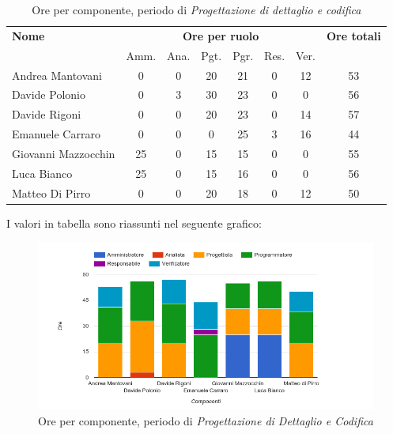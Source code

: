\begin{table}[H]
\begin{tabular}{lccccccc}
\toprule
    \textbf{Nome}  & \multicolumn{6}{c}{\textbf{Ore per ruolo}} & \textbf{Ore totali} \\
     & Amm. & Ana. & Pgt. & Pgr. & Res. & Ver. & \\
    \midrule
    
	   Andrea Mantovani & 0 & 0 & 20 & 21 & 0 & 12 & 53 \\
	     Davide Polonio & 0 & 3 & 30 & 23 & 0 & 0 & 56 \\
	      Davide Rigoni & 0 & 0 & 20 & 23 & 0 & 14 & 57 \\
	   Emanuele Carraro & 0 & 0 & 0 & 25 & 3 & 16 & 44 \\
	Giovanni Mazzocchin & 25 & 0 & 15 & 15 & 0 & 0 & 55 \\
	        Luca Bianco & 25 & 0 & 15 & 16 & 0 & 0 & 56 \\
	    Matteo Di Pirro & 0 & 0 & 20 & 18 & 0 & 12 & 50 \\
    
    
    \bottomrule
\end{tabular}
\caption{Ore per componente, periodo di \textit{Progettazione di dettaglio e codifica}}
\end{table}

I valori in tabella sono riassunti nel seguente grafico: \\ 

    \begin{figure}[H]
      \begin{center}
        \includegraphics[width=15cm]{res/img/suddivisioneRuoloProspettoOrario/orePerComponenteProgettazioneDettaglioCodifica.png}
      \caption{Ore per componente, periodo di \textit{Progettazione di Dettaglio e Codifica}}
      \end{center} 
    \end{figure}    
    
